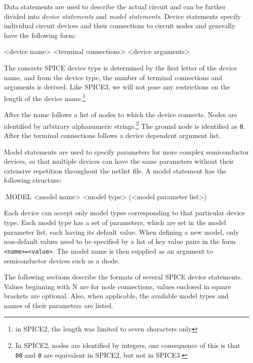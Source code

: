 Data statements are used to describe the actual circuit and can be further divided into \textit{device statements} and \textit{model statements}. Device statements specify individual circuit devices and their connections to circuit nodes and generally have the following form:

\begin{code}
<device name> <terminal connections> <device arguments>
\end{code}

The concrete SPICE device type is determined by the first letter of the device name, and from the device type, the number of terminal connections and arguments is derived. Like SPICE3, we will not pose any restrictions on the length of the device name.\footnote{in SPICE2, the length was limited to seven characters only}

After the name follows a list of nodes to which the device connects. Nodes are identified by arbitrary alphanumeric strings.\footnote{In SPICE2, nodes are identified by integers, one consequence of this is that \texttt{00} and \texttt{0} are equivalent in SPICE2, but not in SPICE3.} The ground node is identified as \texttt{0}. After the terminal connections follows a device dependent argument list.

Model statements are used to specify parameters for more complex semiconductor devices, so that multiple devices can have the same parameters without their extensive repetition throughout the netlist file. A model statement has the following structure:

\begin{code}
.MODEL <model name> <model type> (<model parameter list>) 
\end{code}

Each device can accept only model types corresponding to that particular device type. Each model type has a set of parameters, which are set in the model parameter list, each having its default value. When defining a new model, only non-default values need to be specified by a list of key value pairs in the form \texttt{<name>=<value>}. The model name is then supplied as an argument to semiconductor devices such as a diode. 

The following sections describe the formats of several SPICE device statements. Values beginning with N are for node connections, values enclosed in square brackets are optional. Also, when applicable, the available model types and names of their parameters are listed.

